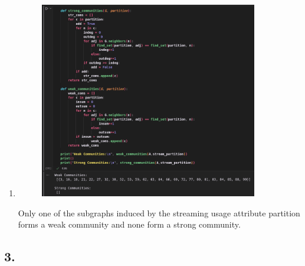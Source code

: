 \documentclass{article}
\begin{document}
\begin{enumerate}[label=(\alph*), left=10pt, itemsep=10pt]
        \item \begin{minipage}[t]{0.9\textwidth}
            \begin{figure}[H]
                \centering
                \includegraphics[width=0.9\textwidth, height=0.45\textheight]{./2g.png}
            \end{figure}
            Only one of the subgraphs induced by the streaming usage attribute partition forms
            a weak community and none form a strong community.
        \end{minipage}

    \end{enumerate}


    \subsection*{3.}
\end{document}
